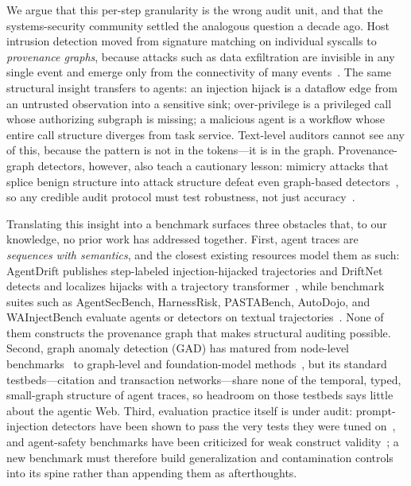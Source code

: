 We argue that this per-step granularity is the wrong audit unit, and that the systems-security community settled the analogous question a decade ago. Host intrusion detection moved from signature matching on individual syscalls to \emph{provenance graphs}, because attacks such as data exfiltration are invisible in any single event and emerge only from the connectivity of many events~\cite{zipperle2022provenancebased}. The same structural insight transfers to agents: an injection hijack is a dataflow edge from an untrusted observation into a sensitive sink; over-privilege is a privileged call whose authorizing subgraph is missing; a malicious agent is a workflow whose entire call structure diverges from task service. Text-level auditors cannot see any of this, because the pattern is not in the tokens---it is in the graph. Provenance-graph detectors, however, also teach a cautionary lesson: mimicry attacks that splice benign structure into attack structure defeat even graph-based detectors~\cite{goyal2023sometimes}, so any credible audit protocol must test robustness, not just accuracy~\cite{goyal2024orchid}.

Translating this insight into a benchmark surfaces three obstacles that, to our knowledge, no prior work has addressed together. First, agent traces are \emph{sequences with semantics}, and the closest existing resources model them as such: AgentDrift publishes step-labeled injection-hijacked trajectories and DriftNet detects and localizes hijacks with a trajectory transformer~\cite{pinjari2026agentdrift,pinjari2026driftnet}, while benchmark suites such as AgentSecBench, HarnessRisk, PASTABench, AutoDojo, and WAInjectBench evaluate agents or detectors on textual trajectories~\cite{alpay2026agentsecbench,bai2026harnessrisk,sun2026pastabench,ma2026autodojo,liu2025wainjectbench}. None of them constructs the provenance graph that makes structural auditing possible. Second, graph anomaly detection (GAD) has matured from node-level benchmarks~\cite{liu2022bond,tang2023gadbench} to graph-level and foundation-model methods~\cite{qiao2024deep,wang2026glass}, but its standard testbeds---citation and transaction networks---share none of the temporal, typed, small-graph structure of agent traces, so headroom on those testbeds says little about the agentic Web. Third, evaluation practice itself is under audit: prompt-injection detectors have been shown to pass the very tests they were tuned on~\cite{liu2026passing}, and agent-safety benchmarks have been criticized for weak construct validity~\cite{wang2026safety}; a new benchmark must therefore build generalization and contamination controls into its spine rather than appending them as afterthoughts.

